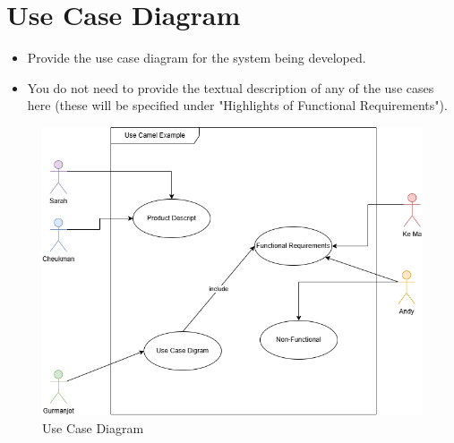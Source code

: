 \section{Use Case Diagram}
\label{sec:use_case_diagram}
\begin{itemize}
	\item Provide the use case diagram for the system being developed.
	\item You do not need to provide the textual description of any of the use cases here (these will be specified under "Highlights of Functional Requirements").
\end{itemize}


\begin{figure}
	\includegraphics[width=\linewidth]{Section3/Example_Use_Case.png}
	\caption{Use Case Diagram}
	\label{UseCaseDiagram}
\end{figure}

%
%
%
